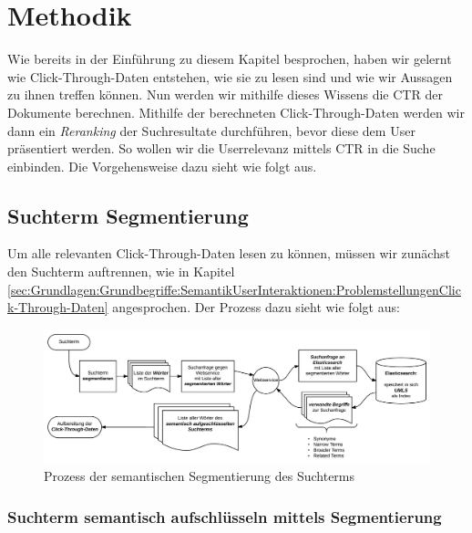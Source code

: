 
\section{Methodik}
\label{sec:Reranking:Methodik}

Wie bereits in der Einführung zu diesem Kapitel besprochen, haben wir gelernt wie Click-Through-Daten entstehen, wie sie zu lesen sind und wie wir Aussagen zu ihnen treffen können. Nun werden wir mithilfe dieses Wissens die CTR der Dokumente berechnen. Mithilfe der berechneten Click-Through-Daten werden wir dann ein \textit{Reranking} der Suchresultate durchführen, bevor diese dem User präsentiert werden. So wollen wir die Userrelevanz mittels CTR in die Suche einbinden. Die Vorgehensweise dazu sieht wie folgt aus.

\subsection{Suchterm Segmentierung}
\label{sec:Reranking:Methodik:SuchtermSegmentierung}

Um alle relevanten Click-Through-Daten lesen zu können, müssen wir zunächst den Suchterm auftrennen, wie in Kapitel \ref{sec:Grundlagen:Grundbegriffe:SemantikUserInteraktionen:ProblemstellungenClick-Through-Daten} angesprochen. Der Prozess dazu sieht wie folgt aus:

\begin{figure}[H]
\centering
\vspace{-1em}
\caption[Prozess der semantischen Segmentierung des Suchterms]{Prozess der semantischen Segmentierung des Suchterms}
\label{fig:SemantischeSegmentierung}
\includegraphics[width=\linewidth]{gfx/SuchtermSegmentierung}
\vspace{-2em}
\end{figure} 

\subsubsection{Suchterm semantisch aufschlüsseln mittels Segmentierung}
\label{sec:Reranking:Methodik:SuchtermSegmentierung:SuchtermSegmentierung}

